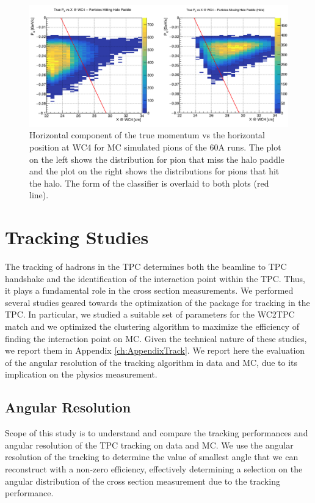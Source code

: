 \begin{figure}[hbpt]
\centering
\includegraphics[width=\textwidth]{Chapter-5/Images/PXVsX60A.png}
\caption{Horizontal component of the true momentum vs the horizontal position at WC4 for MC simulated pions of the 60A runs. The plot on the left shows the distribution for pion that miss the halo paddle and the plot on the right shows the distributions for pions that hit the halo. The form of the classifier is overlaid to both plots (red line).}
\label{fig:PxVsXTrue}
\end{figure}

\section{Tracking Studies}\label{sec:TrackingStudies}
The tracking of hadrons in the TPC determines both the beamline to TPC handshake and the identification of the interaction point within the TPC. Thus, it plays a fundamental role in the cross section measurements. We performed several studies geared towards the optimization of the package for tracking in the TPC. In particular, we studied a suitable set of parameters for the WC2TPC match and we optimized the clustering algorithm to maximize the efficiency of finding the interaction point on MC. Given the technical nature of these studies, we report them in Appendix \ref{ch:AppendixTrack}. 
We report here the evaluation of  the angular resolution of the tracking algorithm in data and MC, due to its implication on the physics measurement.


\subsection{Angular Resolution}\label{sec:angleRes}
Scope of this study is to understand and compare the tracking performances and angular resolution of the TPC tracking on data and MC. 
We use the angular resolution of the tracking to determine  the value of smallest angle that we can reconstruct with a non-zero efficiency, effectively determining a selection on the angular distribution of the cross section measurement due to the tracking performance. %

